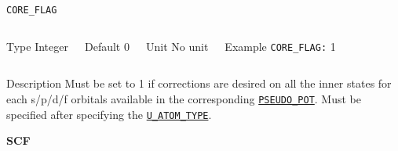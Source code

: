 \documentclass[xcolor=dvipsnames,t]{beamer}
\begin{document}
\begin{frame}[allowframebreaks]{\texttt{CORE\_FLAG}} \label{CORE_FLAG}
\vspace*{-12pt}
\begin{columns}
\begin{block}{Type}
Integer
\end{block}

\begin{block}{Default}
0
\end{block}

\begin{block}{Unit}
No unit
\end{block}

\begin{block}{Example}
\texttt{CORE\_FLAG:} 1 \\
\end{block}
\end{columns}

\begin{block}{Description}
Must be set to 1 if corrections are desired on all the inner states for each s/p/d/f orbitals available in the corresponding \hyperlink{PSEUDO_POT}{\texttt{PSEUDO\_POT}}. Must be specified after specifying the \hyperlink{U_ATOM_TYPE}{\texttt{U\_ATOM\_TYPE}}.
\end{block}

\end{frame}


\begin{frame}[allowframebreaks,c]{} \label{SCF}

\begin{center}
\Huge \textbf{SCF}
\end{center}

\end{frame}
\end{document}
